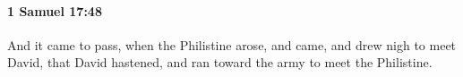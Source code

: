 
		\paragraph{1 Samuel 17:48} %
			\label{1SAMUEL-17-48}

			And it came to pass, when the Philistine arose, and came, and drew nigh to meet David, that David hastened, and ran toward the army to meet the Philistine.


